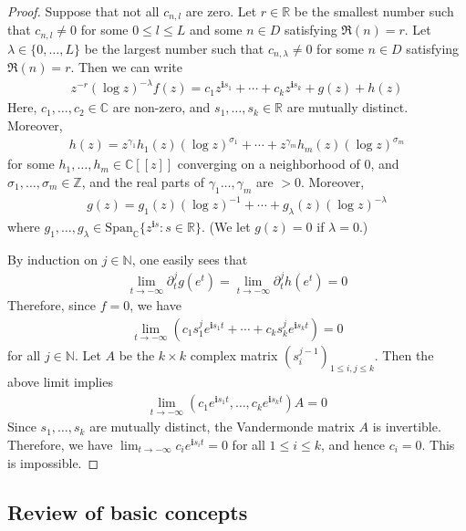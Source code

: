 \documentclass[11pt,b5paper,notitlepage]{article}
\theoremstyle{definition}
\theoremstyle{plain}
\newcommand{\Span}{\mathrm{Span}}
\newcommand{\im}{\mathbf{i}}
\newcommand{\Cbb}{\mathbb C}
\newcommand{\Nbb}{\mathbb N}
\newcommand{\Zbb}{\mathbb Z}
\newcommand{\Rbb}{\mathbb R}
\newcommand{\<}{\left\langle}
\renewcommand{\>}{\right\rangle}
\numberwithin{equation}{section}
\begin{document}
\begin{proof}
Suppose that not all $c_{n,l}$ are zero. Let $r\in\Rbb$ be the smallest number such that $c_{n,l}\neq0$ for some $0\leq l\leq L$ and some $n\in D$ satisfying $\Re(n)=r$. Let $\lambda\in\{0,\dots,L\}$ be the largest number such that $c_{n,\lambda}\neq 0$ for some $n\in D$ satisfying $\Re(n)=r$. Then we can write
\begin{align*}
z^{-r}(\log z)^{-\lambda}f(z)=c_1z^{\im s_1}+\cdots+c_kz^{\im s_k}+g(z)+h(z)
\end{align*}
Here, $c_1,\dots,c_2\in\Cbb$ are non-zero, and $s_1,\dots,s_k\in\Rbb$ are mutually distinct.  Moreover,
\begin{align*}
h(z)=z^{\gamma_1}h_1(z)(\log z)^{\sigma_1}+\cdots+z^{\gamma_m}h_m(z)(\log z)^{\sigma_m}
\end{align*} 
for some $h_1,\dots,h_m\in\Cbb[[z]]$ converging on a neighborhood of $0$, and $\sigma_1,\dots,\sigma_m\in\Zbb$, and the real parts of $\gamma_1\dots,\gamma_m$ are $>0$.  Moreover,
\begin{align*}
g(z)=g_1(z)(\log z)^{-1}+\cdots+g_\lambda(z)(\log z)^{-\lambda}
\end{align*}
where $g_1,\dots,g_\lambda\in\Span_\Cbb\{z^{\im s}:s\in\Rbb\}$. (We let $g(z)=0$ if $\lambda=0$.)


By induction on $j\in\Nbb$, one easily sees that
\begin{align*}
\lim_{t\rightarrow-\infty}\partial^j_tg(e^t)=\lim_{t\rightarrow-\infty}\partial^j_th(e^t)=0
\end{align*}
Therefore, since $f=0$, we have
\begin{align*}
\lim_{t\rightarrow-\infty} (c_1s_1^je^{\im s_1t}+\cdots+c_ks_k^je^{\im s_kt})=0
\end{align*}
for all $j\in\Nbb$. Let $A$ be the $k\times k$ complex matrix $(s_i^{j-1})_{1\leq i,j\leq k}$. Then the above limit implies
\begin{align*}
\lim_{t\rightarrow-\infty}(c_1e^{\im s_1t},\dots,c_ke^{\im s_kt})A=0
\end{align*}
Since $s_1,\dots,s_k$ are mutually distinct, the Vandermonde matrix $A$ is invertible. Therefore, we have $\lim_{t\rightarrow-\infty} c_ie^{\im s_it}=0$ for all $1\leq i\leq k$, and hence $c_i=0$. This is impossible.
\end{proof}



\subsection{Review of basic concepts}\label{lb10}
\end{document}

